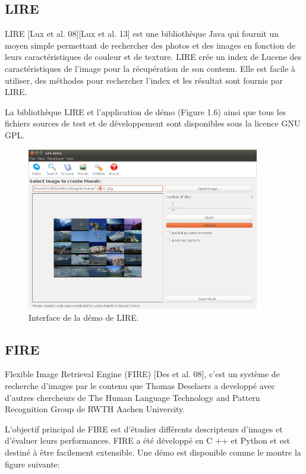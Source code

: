 \subsection*{LIRE}
	LIRE [Lux et al. 08][Lux et al. 13] est une bibliothèque Java qui fournit un moyen simple permettant de rechercher des photos et des images en fonction de leurs caractéristiques de couleur et de texture. LIRE crée un index de Lucene des caractéristiques de l'image pour la récupération de son contenu. Elle est facile à utiliser, des méthodes pour rechercher l'index et les résultat sont fournis par LIRE.
	
	La bibliothèque LIRE et l'application de démo (Figure 1.6) ainsi que tous les fichiers sources de test et de développement sont disponibles sous la licence GNU GPL.

\begin{figure}[H]
	\centering
		\includegraphics[width=4in]{Figures/lire-demo.png}
	\caption[An Electron]{Interface de la démo de LIRE.}
	\label{fig:Electron}
\end{figure}


\subsection*{FIRE}
	Flexible Image Retrieval Engine (FIRE) [Des et al. 08], c'est un système de recherche d'images par le contenu que Thomas Deselaers a developpé avec d'autres chercheurs de The Human Language Technology and Pattern Recognition Group de RWTH Aachen University.

L'objectif principal de FIRE est d'étudier différents descripteurs d'images et d'évaluer leurs performances. FIRE a été développé en C ++ et Python et est destiné à être facilement extensible. Une démo est disponible comme le montre la figure suivante:


